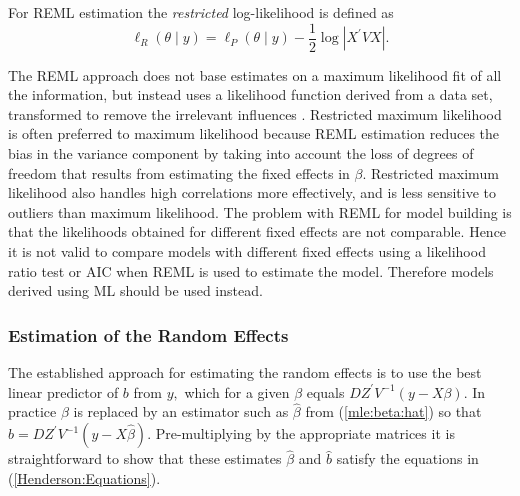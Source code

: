 \documentclass[12pt, a4paper]{report}
\theoremstyle{plain}
\theoremstyle{definition}
\theoremstyle{remark}
\begin{document}
For REML estimation the \emph{restricted} log-likelihood is defined as
			\[
			\ell_R(\theta \mid y) =
			\ell_P(\theta \mid y) -\frac{1}{2} \log |X^\prime VX |.
			\]
			
The REML approach does not base estimates on a maximum likelihood fit of all the information, but instead uses a likelihood function derived from a data set, transformed to remove the irrelevant influences \citep{REMLDefine}. Restricted maximum likelihood is often preferred to maximum likelihood because REML estimation reduces the bias in the variance component by taking into account the loss of degrees of freedom that results from estimating the fixed effects in ${\beta}$. Restricted maximum likelihood also handles high correlations more effectively, and is less sensitive to outliers than maximum likelihood.  The problem with REML for model building is that the likelihoods obtained for different fixed effects are not comparable. Hence it is not valid to compare models with different fixed effects using a likelihood ratio test or AIC when REML is used to estimate the model. Therefore models derived using ML should be used instead.
			
\subsubsection{Estimation of the Random Effects}
			
The established approach for estimating the random effects is to use the best linear predictor of $b$ from $y,$ which for a given $\beta$ equals $DZ^\prime V^{-1}(y - X \beta).$ In practice $\beta$ is replaced by an estimator such as $\hat{\beta}$ from (\ref{mle:beta:hat}) so that $\hat{b} = DZ^\prime V^{-1}(y - X \hat{\beta}).$ Pre-multiplying by the appropriate matrices it is straightforward to show that these estimates $\hat{\beta}$ and $\hat{b}$ satisfy the equations in (\ref{Henderson:Equations}).
			
\end{document}
